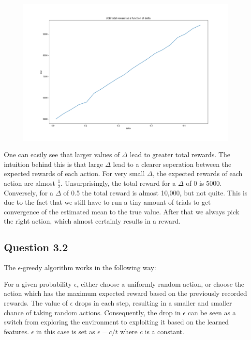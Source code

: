 \documentclass[a4paper, 11pt]{article} %
\begin{document}
\begin{figure}[h]
	\centering
	\includegraphics[scale = 0.4]{UCB_reward}
	\caption{}
\end{figure}

One can easily see that larger values of $\Delta$ lead to greater total rewards. The intuition behind this is that large $\Delta$ lead to a clearer seperation between the expected rewards of each action. For very small $\Delta$, the expected rewards of each action are almost $\frac{1}{2}$. Unsurprisingly, the total reward for a $\Delta$ of 0 is 5000. Conversely, for a $\Delta$ of 0.5 the total reward is almost 10,000, but not quite. This is due to the fact that we still have to run a tiny amount of trials to get convergence of the estimated mean to the true value. After that we always pick the right action, which almost certainly results in a reward.

\subsection*{Question 3.2}

The $\epsilon$-greedy algorithm works in the following way:

For a given probability $\epsilon$, either choose a uniformly random action, or choose the action which has the maximum expected reward based on the previously recorded rewards. The value of $\epsilon$ drops in each step, resulting in a smaller and smaller chance of taking random actions. Consequently, the drop in $\epsilon$ can be seen as a switch from exploring the environment to exploiting it based on the learned features. $\epsilon$ in this case is set as $\epsilon = c/t$ where $c$ is a constant.
\end{document}
